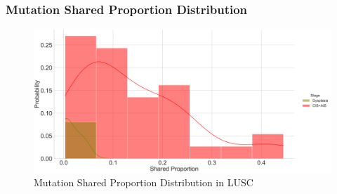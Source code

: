 \documentclass{beamer}
\begin{document}
    \begin{frame}
        \frametitle{Mutation Shared Proportion Distribution}

        \begin{figure}
            \includegraphics[width=0.8 \linewidth]{figures/Mutation_Shared_Proportion/Histogram/BWA.SQC-stage.SharedProportion.pdf}
            \caption{Mutation Shared Proportion Distribution in LUSC}
        \end{figure}
    \end{frame}
\end{document}
